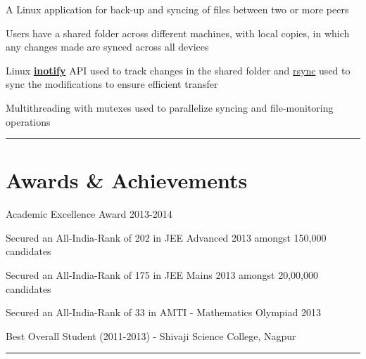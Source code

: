\documentclass[letterpaper]{Formatting}
\begin{document}
\begin{minipage}[t]{0.66\textwidth}
A Linux application for back-up and syncing of files between two or more peers
\vspace{\topsep} %
\footnotesize{
\begin{tightitemize}
\item Users have a shared folder across different machines, with local copies, in which any changes made are synced across all devices
\item Linux \href{http://man7.org/linux/man-pages/man7/inotify.7.html}{\textbf{inotify}} API used to track changes in the shared folder and \href{http://linux.about.com/library/cmd/blcmdl1_rsync.htm}{rsync} used to sync the modifications to ensure efficient transfer
\item Multithreading with mutexes used to parallelize syncing and file-monitoring operations
\end{tightitemize}
}
\sectionspace
\vspace{0.1ex}
\rule{12cm}{0.5pt}

\vspace{1.5ex}
\section{Awards \& Achievements} 
\vspace{\topsep}
\small{
\begin{tightitemize}
\item Academic Excellence Award 2013-2014\\
\item Secured an All-India-Rank of 202 in JEE Advanced 2013 amongst 150,000 candidates\\
\item Secured an All-India-Rank of 175 in JEE Mains 2013 amongst 20,00,000 candidates\\
\item Secured an All-India-Rank of 33 in AMTI - Mathematics Olympiad 2013\\
\item Best Overall Student (2011-2013) - Shivaji Science College, Nagpur \\
\end{tightitemize}
}
\sectionspace %
\vspace{0.1ex}
\rule{12cm}{0.25pt}
\end{minipage} %
\end{document}
